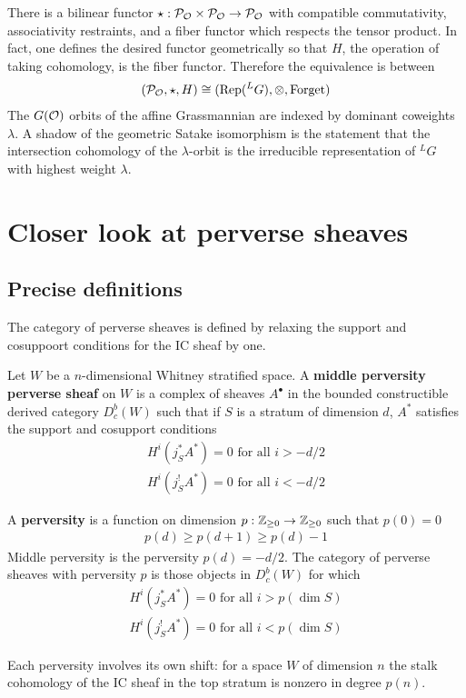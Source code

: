 \documentclass[12pt]{article}
\begin{document}
There is a bilinear functor $\star:{\mathcal{P}}_{{\mathcal{O}}}\times {\mathcal{P}}_{{\mathcal{O}}} \to {\mathcal{P}}_{{\mathcal{O}}}$ with compatible
commutativity, associativity restraints, and a fiber functor which respects the tensor product.
In fact, one defines the desired functor geometrically so that $H$, the operation
of taking cohomology, is the fiber functor. Therefore 
the equivalence is between \begin{align*}
    ({\mathcal{P}}_{{\mathcal{O}}},\star,H) \cong (\operatorname{Rep}(^L G), \otimes, \text{Forget})
\end{align*}
The $G({\mathcal{O}})$ orbits of the affine Grassmannian are indexed by dominant coweights $\lambda$.
A shadow of the geometric Satake isomorphism is the statement that the 
intersection cohomology of the $\lambda$-orbit is the irreducible representation of $^L G$
with highest weight $\lambda$.

\section{Closer look at perverse sheaves}

\subsection{Precise definitions}
The category of perverse sheaves is defined by relaxing 
the support and cosuppoort conditions for the IC sheaf by one.

\begin{definition}
    Let $W$ be a $n$-dimensional Whitney stratified space. A \textbf{middle perversity 
    perverse sheaf} on $W$ is a complex of sheaves $A^\bullet$ in the bounded 
    constructible derived category $D^b_c(W)$ such that if $S$ is a stratum of 
    dimension $d$, $A^*$ satisfies the support and cosupport conditions
    \begin{align*}
        H^i(j^*_SA^*) = 0 \text{ for all } i > -d/2\\
        H^i(j^!_SA^*) = 0 \text{ for all } i < -d/2
    \end{align*}
\end{definition}

\begin{definition}
    A \textbf{perversity} is a function on dimension $p:\mathbb{Z}_{\geq 0}\to \mathbb{Z}_{\geq 0}$
     such that $p(0) = 0$ \begin{align*}
        p(d) \geq p(d+1) \geq p(d) - 1
     \end{align*} Middle perversity is the perversity $p(d) = -d/2$. The 
     category of perverse sheaves with perversity $p$ is those objects in $D^b_c(W)$
     for which \begin{align*}
        H^i(j^*_SA^*) = 0 \text{ for all } i > p(\dim S)\\
        H^i(j^!_SA^*) = 0 \text{ for all } i < p(\dim S)
    \end{align*}
\end{definition}
Each perversity involves its own shift: for a space $W$ of dimension $n$ the stalk
cohomology of the IC sheaf in the top stratum is nonzero in degree $p(n)$.
\end{document}
